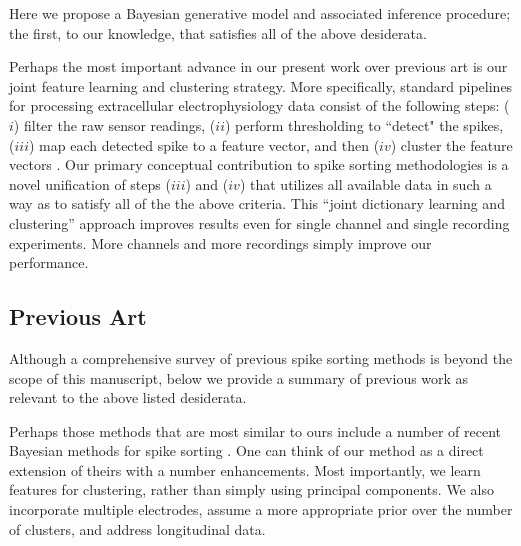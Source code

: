 \documentclass[journal]{IEEEtran}
\begin{document}
Here we propose a Bayesian generative model and associated inference procedure; the first, to our knowledge, that satisfies all of the above desiderata.

Perhaps the most important advance in our present work over previous art is our joint feature learning and clustering strategy.  More specifically, 
% 
standard pipelines for processing extracellular electrophysiology data consist of the following steps:
($i$) filter the raw sensor readings, 
($ii$) perform thresholding to ``detect" the spikes, 
($iii$) map each detected spike to a feature vector, and then
($iv$)  cluster the feature vectors
\cite{Lewicki}. 
Our primary conceptual contribution to spike sorting methodologies is a novel unification of steps ($iii$) and ($iv$) that utilizes all available data in such a way as to satisfy all of the the above criteria. This ``joint dictionary learning and clustering'' approach improves results even for single channel and single recording experiments.  More channels and more recordings simply improve our performance.

\subsection{Previous Art} %
\label{sec:background}

Although a comprehensive survey of previous spike sorting methods is beyond the scope of this manuscript, below we provide a summary of previous work as relevant to the above listed desiderata.

Perhaps those methods that are most similar to ours include a number of recent Bayesian methods for spike sorting \cite{Wood2009,Bo2011}.  One can think of our method as a direct extension of theirs with a number enhancements. Most importantly, we learn features for clustering, rather than simply using principal components. We also incorporate multiple electrodes,  assume a more appropriate prior over the number of clusters, and address longitudinal data.

\end{document}
